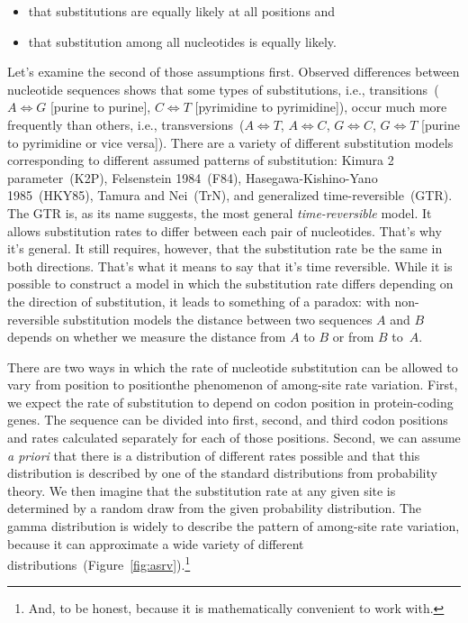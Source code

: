 \begin{itemize}

\item that substitutions are equally likely at all positions and

\item that substitution among all nucleotides is equally likely.

\end{itemize}

Let's examine the second of those assumptions first. Observed
differences between nucleotide sequences shows that some types of
substitutions, i.e., transitions~($A \iff G$ [purine to purine], $C
\iff T$ [pyrimidine to pyrimidine]), occur much more frequently than
others, i.e., transversions~($A \iff T$, $A \iff C$, $G \iff C$, $G
\iff T$ [purine to pyrimidine or vice versa]). There are a variety of
different substitution models corresponding to different assumed
patterns of substitution: Kimura 2 parameter~(K2P), Felsenstein
1984~(F84), Hasegawa-Kishino-Yano 1985~(HKY85), Tamura and Nei~(TrN),
and generalized time-reversible~(GTR). The GTR is, as its name
suggests, the most general {\it time-reversible\/} model. It allows
substitution rates to differ between each pair of nucleotides. That's
why it's general. It still requires, however, that the substitution
rate be the same in both directions. That's what it means to say that
it's time reversible. While it is possible to construct a model in
which the substitution rate differs depending on the direction of
substitution, it leads to something of a paradox: with non-reversible
substitution models the distance between two sequences $A$ and $B$
depends on whether we measure the distance from $A$ to $B$ or from $B$
to~$A$.

There are two ways in which the rate of nucleotide substitution can be
allowed to vary from position to position{\dash}the phenomenon of
among-site rate variation. First, we expect the rate of substitution
to depend on codon position in protein-coding genes. The sequence can
be divided into first, second, and third codon positions and rates
calculated separately for each of those positions. Second, we can
assume {\it a priori\/} that there is a distribution of different
rates possible and that this distribution is described by one of the
standard distributions from probability theory. We then imagine that
the substitution rate at any given site is determined by a random draw
from the given probability distribution. The gamma distribution is
widely to describe the pattern of among-site rate variation, because
it can approximate a wide variety of different
distributions~(Figure~\ref{fig:asrv}).\footnote{And, to be honest,
  because it is mathematically convenient to work
  with.}

